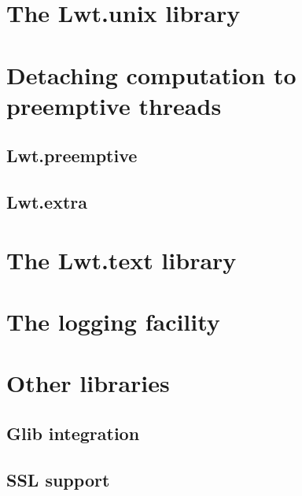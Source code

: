 \documentclass{article}
\begin{document}
\section{The Lwt.unix library}

\section{Detaching computation to preemptive threads}

\subsection{Lwt.preemptive}
\subsection{Lwt.extra}

\section{The Lwt.text library}

\section{The logging facility}

\section{Other libraries}

\subsection{Glib integration}
\subsection{SSL support}
\end{document}
